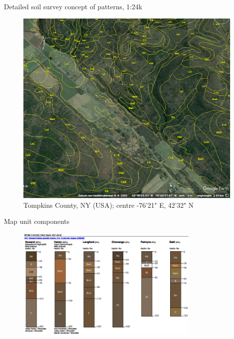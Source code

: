 \documentclass[aspectratio=169]{beamer}
\begin{document}
\begin{frame}{Detailed soil survey concept of patterns, 1:24k}
    \begin{figure}
        \centering
\includegraphics[height=0.7\textheight]{./graphics_david/PonyHollow_SoilWeb_Screenshot.png}\\
{Tompkins County, NY (USA); centre -76'21" E, 42'32" N}
     \end{figure}
    \end{frame}

\begin{frame}{Map unit components}
    \begin{figure}
        \centering
\includegraphics[width=0.8\textwidth]{./graphics_david/SoilWeb_pH05_PonyHollowMoraine_MapUnits.png}
     \end{figure}
    \end{frame}
\end{document}
